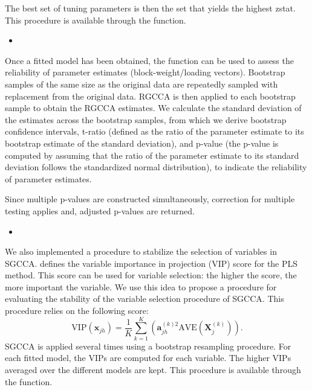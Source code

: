 \documentclass[
]{jss}
\begin{document}
The best set of tuning parameters is then the set that yields the
highest zstat. This procedure is available through the
 function.

\begin{itemize}
\item
\end{itemize}

Once a fitted model has been obtained, the 
function can be used to assess the reliability of parameter estimates
(block-weight/loading vectors). Bootstrap samples of the same size as
the original data are repeatedly sampled with replacement from the
original data. RGCCA is then applied to each bootstrap sample to obtain
the RGCCA estimates. We calculate the standard deviation of the
estimates across the bootstrap samples, from which we derive bootstrap
confidence intervals, t-ratio (defined as the ratio of the parameter
estimate to its bootstrap estimate of the standard deviation), and
p-value (the p-value is computed by assuming that the ratio of the
parameter estimate to its standard deviation follows the standardized
normal distribution), to indicate the reliability of parameter
estimates.

Since multiple p-values are constructed simultaneously, correction for
multiple testing applies and, adjusted p-values are returned.

\begin{itemize}
\item
\end{itemize}

We also implemented a procedure to stabilize the selection of variables
in SGCCA. \cite{Tenenhaus1998} defines the variable importance in
projection (VIP) score for the PLS method. This score can be used for
variable selection: the higher the score, the more important the
variable. We use this idea to propose a procedure for evaluating the
stability of the variable selection procedure of SGCCA. This procedure
relies on the following score: \begin{equation}
\displaystyle \mathrm{VIP}(\mathbf{x}_{jh}) = \frac{1}{K} \sum_{k=1}^K \left(\mathbf{a}_{jh}^{(k)2} \mathrm{AVE}\left(\mathbf X_j^{(k)}\right)\right).
\label{VIP}
\end{equation} SGCCA is applied several times using a bootstrap
resampling procedure. For each fitted model, the VIPs are computed for
each variable. The higher VIPs averaged over the different models are
kept. This procedure is available through the 
function.
\end{document}
